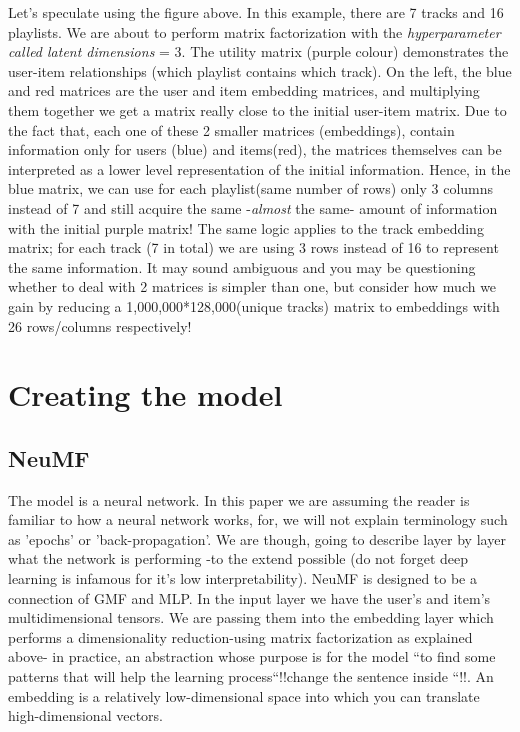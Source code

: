 \documentclass[]{article}
\begin{document}
\begin{center}
	Let's speculate using the figure above. In this example, there are 7 tracks and 16 playlists. We are about to perform matrix factorization with the \textit{hyperparameter called latent dimensions} = 3. The utility matrix (purple colour) demonstrates the user-item relationships (which playlist contains which track). On the left, the blue and red matrices are the user and item embedding matrices, and multiplying them together we get a matrix really close to the initial user-item matrix. Due to the fact that, each one of these 2 smaller matrices (embeddings), contain information only for users (blue) and items(red), the matrices themselves can be interpreted as a lower level representation of the initial information. Hence, in the blue matrix, we can use for each playlist(same number of rows) only 3 columns instead of 7 and still acquire the same -\textit{almost} the same- amount of information with the initial purple matrix! The same logic applies to the track embedding matrix; for each track (7 in total) we are using 3 rows instead of 16 to represent the same information. It may sound ambiguous and you may be questioning whether to deal with 2 matrices is simpler than one, but consider how much we gain by reducing a 1,000,000*128,000(unique tracks) matrix to embeddings with 26 rows/columns respectively! 
\end{center}

\section{Creating the model}
\subsection{NeuMF}
The model is a neural network. In this paper we are assuming the reader is familiar to how a neural network works, for, we will not explain terminology such as 'epochs' or 'back-propagation'. We are though, going to describe layer by layer what the network is performing -to the extend possible (do not forget deep learning is infamous for it's low interpretability).
NeuMF is designed to be a connection of GMF and MLP. In the input layer we have the user's and item's multidimensional tensors. We are passing them into the embedding layer which performs a dimensionality reduction-using matrix factorization as explained above- in practice, an abstraction whose purpose is for the model ``to find some patterns that will help the learning process``!!change the sentence inside ``!!. An embedding is a relatively low-dimensional space into which you can translate high-dimensional vectors.
\end{document}
